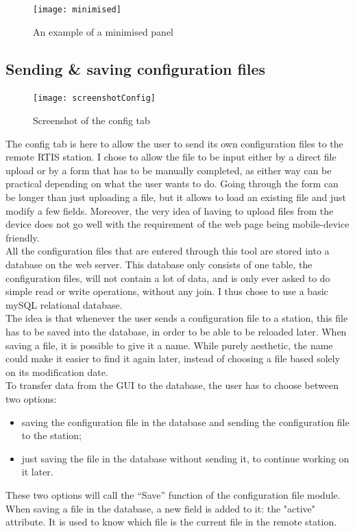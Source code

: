 \documentclass{themeensg}
\begin{document}
\begin{figure}[H]
	\centering
	\texttt{[image: minimised]}
	\caption{An example of a minimised panel}
\end{figure}


\newpage
\subsection{Sending \& saving configuration files}

\begin{figure}[ht]
	\centering
	\texttt{[image: screenshotConfig]}
	\caption{Screenshot of the config tab}
\end{figure}


The config tab is here to allow the user to send its own configuration files to the remote RTIS station. I chose to allow the file to be input either by a direct file upload or by a form that has to be manually completed, as either way can be practical depending on what the user wants to do. Going through the form can be longer than just uploading a file, but it allows to load an existing file and just modify a few fields. Moreover, the very idea of having to upload files from the device does not go well with the requirement of the web page being mobile-device friendly.\\

All the configuration files that are entered through this tool are stored into a database on the web server. This database only consists of one table, the configuration files, will not contain a lot of data, and is only ever asked to do simple read or write operations, without any join. I thus chose to use a basic mySQL relational database.\\

The idea is that whenever the user sends a configuration file to a station, this file has to be saved into the database, in order to be able to be reloaded later. When saving a file, it is possible to give it a name. While purely aesthetic, the name could make it easier to find it again later, instead of choosing a file based solely on its modification date.\\
To transfer data from the GUI to the database, the user has to choose between two options: \begin{itemize}
\item saving the configuration file in the database and sending the configuration file to the station;
\item just saving the file in the database without sending it, to continue working on it later.
\end{itemize}
These two options will call the “Save” function of the configuration file module. When saving a file in the database, a new field is added to it: the "active" attribute. It is used to know which file is the current file in the remote station.
\end{document}
